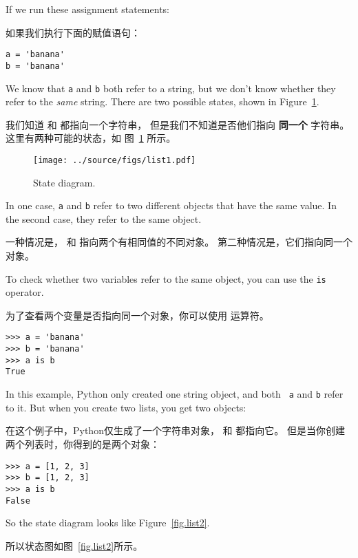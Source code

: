 If we run these assignment statements:

如果我们执行下面的赋值语句：

\begin{lstlisting}
a = 'banana'
b = 'banana'
\end{lstlisting}

%
We know that {\tt a} and {\tt b} both refer to a
string, but we don't
know whether they refer to the {\em same} string.
There are two possible states, shown in Figure~\ref{fig.list1}.

我们知道  和  都指向一个字符串， 但是我们不知道是否他们指向 {\bf 同一个} 字符串。 这里有两种可能的状态，如 图~\ref{fig.list1} 所示。


\begin{figure}
\centerline
{\texttt{[image: ../source/figs/list1.pdf]}}
\caption{State diagram.}
\label{fig.list1}
\end{figure}

In one case, {\tt a} and {\tt b} refer to two different objects that
have the same value.  In the second case, they refer to the same
object.

一种情况是， 和  指向两个有相同值的不同对象。
第二种情况是，它们指向同一个对象。

  

To check whether two variables refer to the same object, you can
use the {\tt is} operator.

为了查看两个变量是否指向同一个对象，你可以使用  运算符。

\begin{lstlisting}
>>> a = 'banana'
>>> b = 'banana'
>>> a is b
True
\end{lstlisting}

%
In this example, Python only created one string object, and both {\tt
  a} and {\tt b} refer to it.  But when you create two lists, you get
two objects:

在这个例子中，Python仅生成了一个字符串对象， 和  都指向它。 但是当你创建两个列表时，你得到的是两个对象：

\begin{lstlisting}
>>> a = [1, 2, 3]
>>> b = [1, 2, 3]
>>> a is b
False
\end{lstlisting}

%
So the state diagram looks like Figure~\ref{fig.list2}.

所以状态图如图~\ref{fig.list2}所示。

